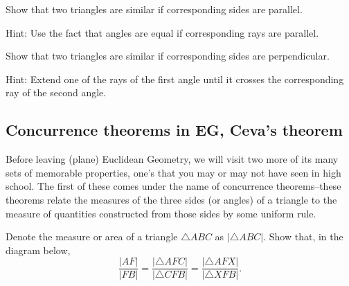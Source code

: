 \begin{question}
\label{39} Show that two triangles are similar if corresponding
sides are parallel.

Hint: Use the fact that angles are equal if corresponding rays are
parallel.
\end{question}

\begin{question}
Show that two triangles are similar if corresponding sides are perpendicular.

Hint: Extend one of the rays of the first angle until it crosses the
corresponding ray of the second angle.
\end{question}

\pagebreak

\subsection*{Concurrence theorems in \textbf{EG}, Ceva's theorem}

Before leaving (plane) Euclidean Geometry, we will visit two more of
its many sets of memorable properties, one's that you may or may not
have seen in high school. The first of these comes under the name of
concurrence theorems--these theorems relate the measures of the three
sides (or angles) of a triangle to the measure of quantities
constructed from those sides by some uniform rule.

\begin{question}
\label{25} Denote the measure or area of a triangle $\triangle
ABC$ as $\left\vert \triangle ABC\right\vert $. Show that, in the
diagram below,
\[
\frac{\left\vert AF\right\vert }{\left\vert FB\right\vert }=\frac{\left\vert
\triangle AFC\right\vert }{\left\vert \triangle CFB\right\vert }%
=\frac{\left\vert \triangle AFX\right\vert }{\left\vert \triangle
XFB\right\vert }.
\]
\begin{image}
\end{image}
\end{question}

